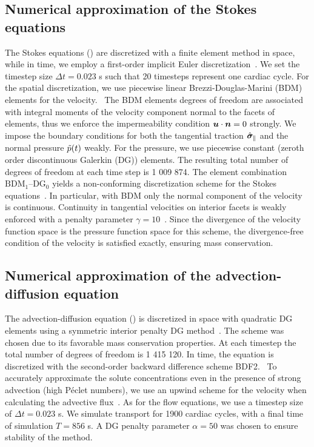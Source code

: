 \documentclass{WileyMSP-template}
\begin{document}
\subsection{Numerical approximation of the Stokes equations}
The Stokes equations () are discretized with a finite element method
in space, while in time, we employ a first-order implicit Euler discretization~\cite{butcher2016numerical}.
We set the timestep size $\Delta t = 0.023$ s such that 20 timesteps represent one cardiac cycle.
For the spatial discretization, we use piecewise linear Brezzi-Douglas-Marini (BDM)
elements for the velocity.~\cite{Brezzi1985TwoProblems, Nedelec1986AIR3}
The BDM elements degrees of freedom are associated with integral moments of the
velocity component normal to the facets of elements,
thus we enforce the impermeability condition $\bm{u}\cdot\bm{n}=0$ strongly.
We impose the boundary conditions for both the tangential traction $\hat{\bm{\sigma}}_{\parallel}$ and
the normal pressure $\Tilde{p}(t)$ weakly.
For the pressure, we use piecewise constant (zeroth order discontinuous Galerkin (DG)) elements.
The resulting total number of degrees of freedom at each time step is 1 009 874.
The element combination $\mathrm{BDM}_1$--$\mathrm{DG}_{0}$ yields a non-conforming
discretization scheme for the Stokes equations~\cite{Stenberg1989SomeEquations}. 
In particular, with BDM only the normal component of the velocity is continuous.
Continuity in tangential velocities on interior facets
is weakly enforced with a penalty parameter $\gamma=10$~\cite{Hong2016AEquations}.
Since the divergence of the velocity function space is the pressure function space for this scheme,
the divergence-free condition of the velocity is satisfied exactly, ensuring mass conservation.~\cite{Boffi2008FiniteProblem} 

\subsection{Numerical approximation of the advection-diffusion equation}\label{subsec:num_approx_adv_diff}
The advection-diffusion equation () is discretized in
space with quadratic DG elements using a symmetric interior penalty DG method~\cite{Arnold1982AnElements}.
The scheme was chosen due to its favorable mass 
conservation properties. At each timestep the total number of degrees of freedom 
is 1 415 120. In time, the equation is discretized with the second-order backward
difference scheme BDF2.~\cite{Volker2016}
To accurately approximate the solute concentrations even
in the presence of strong advection (high Péclet numbers),
we use an upwind scheme for the velocity when calculating the
advective flux~\cite{Patankar2018NumericalFlow}.
As for the flow equations, we use a timestep size of
$\Delta t = 0.023$ s. We simulate transport for 1900 cardiac cycles,
with a final time of simulation $T = 856$ s.
A DG penalty parameter $\alpha = 50$ was chosen to ensure stability of the method. 
\end{document}
